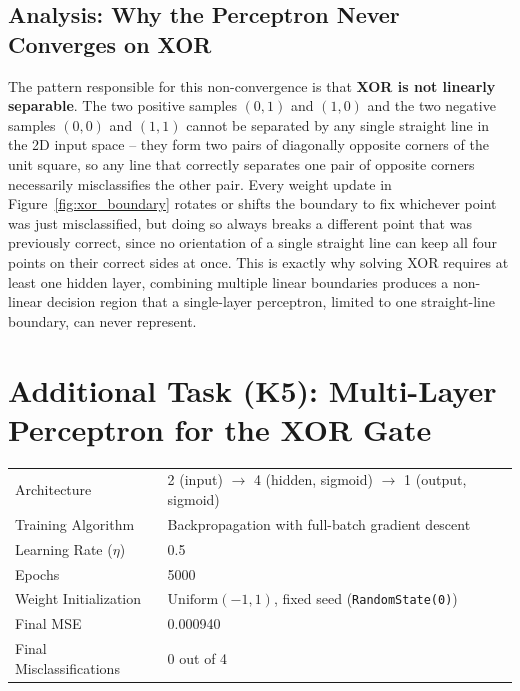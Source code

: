 \documentclass[11pt]{article}
\begin{document}
\subsection*{Analysis: Why the Perceptron Never Converges on XOR}
The pattern responsible for this non-convergence is that \textbf{XOR is not
linearly separable}. The two positive samples $(0,1)$ and $(1,0)$ and the two
negative samples $(0,0)$ and $(1,1)$ cannot be separated by any single
straight line in the 2D input space -- they form two pairs of diagonally
opposite corners of the unit square, so any line that correctly separates one
pair of opposite corners necessarily misclassifies the other pair. Every
weight update in Figure~\ref{fig:xor_boundary} rotates or shifts the boundary
to fix whichever point was just misclassified, but doing so always breaks a
different point that was previously correct, since no orientation of a single
straight line can keep all four points on their correct sides at once. This
is exactly why solving XOR requires at least one hidden layer, combining multiple linear boundaries
produces a non-linear decision region that a single-layer perceptron, limited
to one straight-line boundary, can never represent.

\section{Additional Task (K5): Multi-Layer Perceptron for the XOR Gate}

\begin{tcolorbox}[
    colback=white,
    colframe=black,
    boxrule=0.8pt,
    arc=1pt,
    left=6pt, right=6pt, top=4pt, bottom=4pt,
    title={\textbf{Task Summary}},
    fonttitle=\bfseries,
    colbacktitle=white,
    coltitle=black,
    boxsep=2pt
]
\begin{tabular}{@{}p{4.4cm}l@{}}
    Architecture         & 2 (input) $\to$ 4 (hidden, sigmoid) $\to$ 1 (output, sigmoid) \\
    Training Algorithm   & Backpropagation with full-batch gradient descent \\
    Learning Rate ($\eta$) & 0.5 \\
    Epochs                & 5000 \\
    Weight Initialization  & $\mathrm{Uniform}(-1,1)$, fixed seed (\texttt{RandomState(0)}) \\
    Final MSE              & 0.000940 \\
    Final Misclassifications & 0 out of 4 \\
\end{tabular}
\end{tcolorbox}
\end{document}
